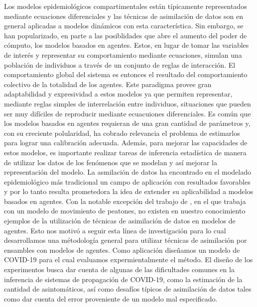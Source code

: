Los modelos epidemiológicos compartimentales están típicamente representados mediante ecuaciones diferenciales y las técnicas de asimilación de datos son en general aplicadas a modelos dinámicos con esta característica. Sin embargo, se han popularizado, en parte a las posiblidades que abre el aumento del poder de cómputo, los modelos basados en agentes. Estos, en lugar de tomar las variables de interés y representar su comportamiento mediante ecuaciones, simulan una población de individuos a través de un conjunto de reglas de interacción. El comportamiento global del sistema es entonces el resultado del comportamiento colectivo de la totalidad de los agentes. Este paradigma provee gran adaptabilidad y expresividad a estos modelos ya que permiten representar, mediante reglas simples de interrelación entre individuos, situaciones que pueden ser muy difíciles de reproducir mediante ecuacuiones diferenciales. Es común que los modelos basados en agentes requieran de una gran cantidad de parámetros y, con su creciente polularidad, ha cobrado relevancia el problema de estimarlos para lograr una calibración adecuada. Además, para mejorar las capacidades de estos modelos, es importante realizar tareas de inferencia estadística de manera de utilizar los datos de los fenómenos que se modelan y así mejorar la representación del modelo. La asmilación de datos ha encontrado en el modelado epidemiológico más tradicional un campo de aplicación con resultados favorables y por lo tanto resulta prometedora la idea de extender su aplicabilidad a modelos basados en agentes. Con la notable excepción del trabajo de \cite{Ward2016}, en el que trabaja con un modelo de movimiento de peatones, no existen en nuestro conocimiento ejemplos de la utilización de técnicas de asimilación de datos en modelos de agentes. Esto nos motivó a seguir esta línea de investigación para lo cual desarrollamos una métodología general para utilizar técnicas de asimilación por ensambles con modelos de agentes. Como aplicación diseñamos un modelo de COVID-19 para el cual evaluamos expermientalmente el método. El diseño de los experimentos busca dar cuenta de algunas de las dificultades comunes en la inferencia de sistemas de propagación de COVID-19, como la estimación de la cantidad de asintomáticos, así como desafíos típicos de asimilación de datos tales como dar cuenta del error proveniente de un modelo mal especificado.

